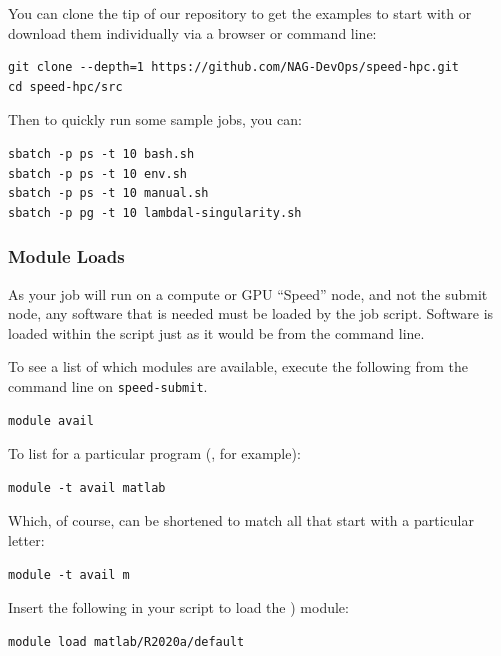 \documentclass{easychair}
\begin{document}
You can clone the tip of our repository to get the examples to start
with or download them individually via a browser or command line:

\small
\begin{verbatim}
git clone --depth=1 https://github.com/NAG-DevOps/speed-hpc.git
cd speed-hpc/src
\end{verbatim}
\normalsize

\noindent
Then to quickly run some sample jobs, you can:
\small
\begin{verbatim}
sbatch -p ps -t 10 bash.sh
sbatch -p ps -t 10 env.sh
sbatch -p ps -t 10 manual.sh
sbatch -p pg -t 10 lambdal-singularity.sh
\end{verbatim}
\normalsize




\subsubsection{Module Loads}
\label{sect:modules}

As your job will run on a compute or GPU ``Speed'' node, and not the submit node,
any software that is needed must be loaded by the job script. Software is loaded
within the script just as it would be from the command line.

To see a list of which modules are available, execute the following from the 
command line on \texttt{speed-submit}.

\begin{verbatim}
module avail
\end{verbatim}

To list for a particular program (, for example):

\begin{verbatim}
module -t avail matlab
\end{verbatim}

Which, of course, can be shortened to match all that start with a
particular letter:

\begin{verbatim}
module -t avail m
\end{verbatim}

Insert the following in your script to load the ) module:

\begin{verbatim}
module load matlab/R2020a/default
\end{verbatim}
\end{document}
